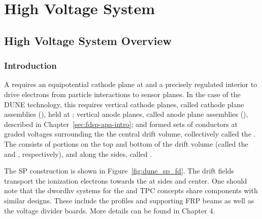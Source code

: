 \chapter{High Voltage System}
\label{ch:fdsp-hv}

\section{High Voltage System Overview}
\label{sec:fdsp-hv-ov}


\subsection{Introduction}
\label{sec:fdsp-hv-intro}

A  requires an equipotential cathode plane at  and a precisely regulated interior \efield{} to drive 
electrons from particle interactions to sensor planes.  In the case of the DUNE  technology, 
this requires vertical cathode planes, called cathode plane assemblies (), held at ; vertical anode planes, called anode plane assemblies  (),  described in Chapter~\ref{sec:fdsp-apa-intro}; and formed sets of conductors at graded voltages surrounding the
 the central drift volume, collectively called the . The  consists of portions on the top and bottom  
of the drift volume (called the  and , respectively), and along the sides, called .


The SP  construction is shown in Figure~\ref{fig:dune_sp_fd}.
The  drift fields transport the ionization electrons 
towards the  at sides and center.
One should note that the dword{hv} systems for the \single and \dual TPC concepts share components with similar designs. These include the  profiles and supporting FRP beams as well as the voltage divider boards. More details can be found in \voltitledpfd Chapter 4.


